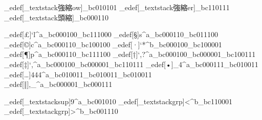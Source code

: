 \brl@char_edef[\brl@char_textstack{強縮}{ow}]{\brl@@lbrace}{\brl@char_bc010101}%
\brl@char_edef[\brl@char_textstack{強縮}{er}]{\brl@@rbrace}{\brl@char_bc110111}%
\brl@char_edef[\brl@char_textstack{頭縮}{}]{\brl@@tilde}{\brl@char_bc000110}

\brl@char_edef[£]{`l^a}{\brl@char_bc000100\brl@char_bc111000}%
\brl@char_edef[§]{\brl@@tilde s^a}{\brl@char_bc000110\brl@char_bc011100}%
\brl@char_edef[©]{\brl@@tilde c^a}{\brl@char_bc000110\brl@char_bc100100}%
\brl@char_edef[·]{`*^b}{\brl@char_bc000100\brl@char_bc100001}%
\brl@char_edef[¶]{\brl@@tilde p^a}{\brl@char_bc000110\brl@char_bc111100}%
\brl@char_edef[†]{`,?^a}{\brl@char_bc000100\brl@char_bc000001\brl@char_bc100111}%
\brl@char_edef[‡]{`,\brl@@rbrace ^a}{\brl@char_bc000100\brl@char_bc000001\brl@char_bc110111}%
\brl@char_edef[•]{_4^a}{\brl@char_bc000111\brl@char_bc010011}%
\brl@char_edef[…]{444^a}{\brl@char_bc010011\brl@char_bc010011\brl@char_bc010011}%
\brl@char_edef[‖]{,_^a}{\brl@char_bc000001\brl@char_bc000111}%


\brl@char_edef[\brl@char_textstack{sup}{}]{9^a}{\brl@char_bc001010}%
\brl@char_edef[\brl@char_textstack{grp}{}]{<^b}{\brl@char_bc110001}%
\brl@char_edef[\brl@char_textstack{grp}{}]{>^b}{\brl@char_bc001110}%

